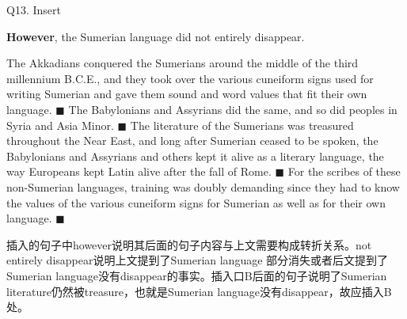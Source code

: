 \begin{blk}
    \begin{qst}
        Q13. Insert

        \textbf{However}, the Sumerian language did not entirely disappear.
    \end{qst}

    \begin{psgq}
        The Akkadians conquered the Sumerians around the middle of the third millennium B.C.E., and they took over the various cuneiform signs used for writing Sumerian and gave them sound and word values that fit their own language. $\blacksquare$ The Babylonians and Assyrians did the same, and so did peoples in Syria and Asia Minor. $\blacksquare$ The literature of the Sumerians was treasured throughout the Near East, and long after Sumerian ceased to be spoken, the Babylonians and Assyrians and others kept it alive as a literary language, the way Europeans kept Latin alive after the fall of Rome. $\blacksquare$ For the scribes of these non-Sumerian languages, training was doubly demanding since they had to know the values of the various cuneiform signs for Sumerian as well as for their own language. $\blacksquare$
    \end{psgq}

    \begin{nlz}
        插入的句子中however说明其后面的句子内容与上文需要构成转折关系。not entirely disappear说明上文提到了Sumerian language 部分消失或者后文提到了Sumerian language没有disappear的事实。插入口B后面的句子说明了Sumerian literature仍然被treasure，也就是Sumerian language没有disappear，故应插入B处。
    \end{nlz}
\end{blk}


